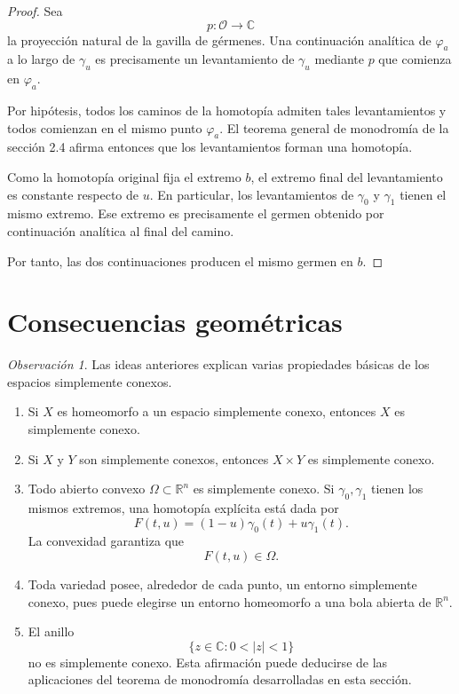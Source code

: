 \documentclass[11pt,a4paper]{article}
\theoremstyle{definition}
\theoremstyle{plain}
\theoremstyle{remark}
\newtheorem{observacion}{Observación}[section]
\newcommand{\C}{\mathbb C}
\newcommand{\R}{\mathbb R}
\begin{document}
\begin{proof}
Sea
\[
p:\mathcal O\longrightarrow\C
\]
la proyección natural de la gavilla de gérmenes. Una continuación
analítica de $\varphi_a$ a lo largo de $\gamma_u$ es precisamente un
levantamiento de $\gamma_u$ mediante $p$ que comienza en
$\varphi_a$.

Por hipótesis, todos los caminos de la homotopía admiten tales
levantamientos y todos comienzan en el mismo punto $\varphi_a$.
El teorema general de monodromía de la sección 2.4 afirma entonces que
los levantamientos forman una homotopía.

Como la homotopía original fija el extremo $b$, el extremo final del
levantamiento es constante respecto de $u$. En particular, los
levantamientos de $\gamma_0$ y $\gamma_1$ tienen el mismo extremo.
Ese extremo es precisamente el germen obtenido por continuación
analítica al final del camino.

Por tanto, las dos continuaciones producen el mismo germen en $b$.
\end{proof}

\section{Consecuencias geométricas}

\begin{observacion}
Las ideas anteriores explican varias propiedades básicas de los
espacios simplemente conexos.

\begin{enumerate}
    \item Si $X$ es homeomorfo a un espacio simplemente conexo, entonces
    $X$ es simplemente conexo.

    \item Si $X$ y $Y$ son simplemente conexos, entonces
    $X\times Y$ es simplemente conexo.

    \item Todo abierto convexo $\Omega\subset\R^n$ es simplemente
    conexo. Si $\gamma_0,\gamma_1$ tienen los mismos extremos, una
    homotopía explícita está dada por
    \[
    F(t,u)=(1-u)\gamma_0(t)+u\gamma_1(t).
    \]
    La convexidad garantiza que
    \[
    F(t,u)\in\Omega.
    \]

    \item Toda variedad posee, alrededor de cada punto, un entorno
    simplemente conexo, pues puede elegirse un entorno homeomorfo a
    una bola abierta de $\R^n$.

    \item El anillo
    \[
    \{z\in\C:0<|z|<1\}
    \]
    no es simplemente conexo. Esta afirmación puede deducirse de las
    aplicaciones del teorema de monodromía desarrolladas en esta
    sección.
\end{enumerate}
\end{observacion}
\end{document}
